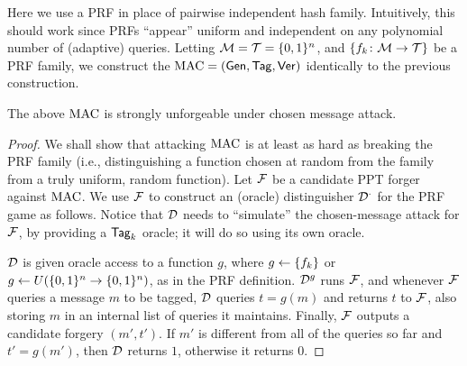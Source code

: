 \documentclass[11pt]{article}
\begin{document}
Here we use a PRF in place of pairwise independent hash family.
Intuitively, this should work since PRFs ``appear'' uniform and
independent on any polynomial number of (adaptive) queries.  Letting
$\mathcal{M} = \mathcal{T} = \{0,1\}^n$, and $\{f_k \colon \mathcal{M} \to
  \mathcal{T}\}$ be a PRF family, we construct the $\text{MAC} = (\mathsf{Gen},
\mathsf{Tag}, \mathsf{Ver})$ identically to the previous construction.

\begin{theorem} 
  The above $\text{MAC}$ is strongly unforgeable under chosen message
  attack.
\end{theorem}

\begin{proof}
  We shall show that attacking $\text{MAC}$ is at least as hard as breaking
  the PRF family (i.e., distinguishing a function chosen at random
  from the family from a truly uniform, random function).  Let $\mathcal{F}$
  be a candidate PPT forger against $\text{MAC}$.  We use $\mathcal{F}$ to
  construct an (oracle) distinguisher $\mathcal{D}^{\cdot}$ for the PRF game
  as follows.  Notice that $\mathcal{D}$ needs to ``simulate'' the
  chosen-message attack for $\mathcal{F}$, by providing a $\mathsf{Tag}_{k}$
  oracle; it will do so using its own oracle.
  
  $\mathcal{D}$ is given oracle access to a function $g$, where $g \gets
  \{f_k\}$ or $g \gets U(\{0,1\}^n \to \{0,1\}^n)$, as in the PRF
  definition.  $\mathcal{D}^{g}$ runs $\mathcal{F}$, and whenever $\mathcal{F}$ queries a
  message $m$ to be tagged, $\mathcal{D}$ queries $t = g(m)$ and returns $t$
  to $\mathcal{F}$, also storing $m$ in an internal list of queries it
  maintains.  Finally, $\mathcal{F}$ outputs a candidate forgery $(m',t')$.
  If $m'$ is different from all of the queries so far and $t' =
  g(m')$, then $\mathcal{D}$ returns $1$, otherwise it returns $0$.


\end{proof}
\end{document}
